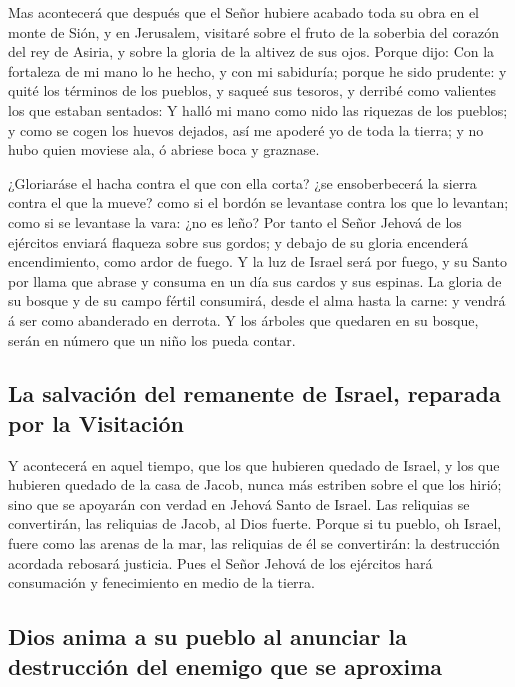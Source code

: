  Mas acontecerá que después que el Señor hubiere acabado
toda su obra en el monte de Sión, y en Jerusalem, visitaré sobre el
fruto de la soberbia del corazón del rey de Asiria, y sobre la gloria de
la altivez de sus ojos.  Porque dijo: Con la fortaleza de
mi mano lo he hecho, y con mi sabiduría; porque he sido prudente: y
quité los términos de los pueblos, y saqueé sus tesoros, y derribé como
valientes los que estaban sentados:  Y halló mi mano como
nido las riquezas de los pueblos; y como se cogen los huevos dejados,
así me apoderé yo de toda la tierra; y no hubo quien moviese ala, ó
abriese boca y graznase.

 ¿Gloriaráse el hacha contra el que con ella corta? ¿se
ensoberbecerá la sierra contra el que la mueve? como si el bordón se
levantase contra los que lo levantan; como si se levantase la vara: ¿no
es leño?  Por tanto el Señor Jehová de los ejércitos
enviará flaqueza sobre sus gordos; y debajo de su gloria encenderá
encendimiento, como ardor de fuego.  Y la luz de Israel
será por fuego, y su Santo por llama que abrase y consuma en un día sus
cardos y sus espinas.  La gloria de su bosque y de su campo
fértil consumirá, desde el alma hasta la carne: y vendrá á ser como
abanderado en derrota.  Y los árboles que quedaren en su
bosque, serán en número que un niño los pueda contar.

\hypertarget{la-salvaciuxf3n-del-remanente-de-israel-reparada-por-la-visitaciuxf3n}{%
\subsection{La salvación del remanente de Israel, reparada por la
Visitación}\label{la-salvaciuxf3n-del-remanente-de-israel-reparada-por-la-visitaciuxf3n}}

 Y acontecerá en aquel tiempo, que los que hubieren quedado
de Israel, y los que hubieren quedado de la casa de Jacob, nunca más
estriben sobre el que los hirió; sino que se apoyarán con verdad en
Jehová Santo de Israel.  Las reliquias se convertirán, las
reliquias de Jacob, al Dios fuerte.  Porque si tu pueblo,
oh Israel, fuere como las arenas de la mar, las reliquias de él se
convertirán: la destrucción acordada rebosará justicia. 
Pues el Señor Jehová de los ejércitos hará consumación y fenecimiento en
medio de la tierra.

\hypertarget{dios-anima-a-su-pueblo-al-anunciar-la-destrucciuxf3n-del-enemigo-que-se-aproxima}{%
\subsection{Dios anima a su pueblo al anunciar la destrucción del
enemigo que se
aproxima}\label{dios-anima-a-su-pueblo-al-anunciar-la-destrucciuxf3n-del-enemigo-que-se-aproxima}}

